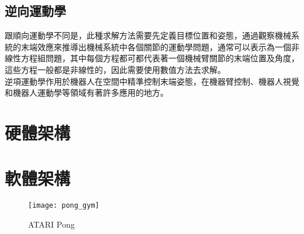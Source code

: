 \subsection{逆向運動學}
跟順向運動學不同是，此種求解方法需要先定義目標位置和姿態，通過觀察機械系統的末端效應來推導出機械系統中各個關節的運動學問題，通常可以表示為一個非線性方程組問題，其中每個方程都可都代表著一個機械臂關節的末端位置及角度，這些方程一般都是非線性的，因此需要使用數值方法去求解。\\
逆項運動學作用於機器人在空間中精準控制末端姿態，在機器臂控制、機器人視覺和機器人運動學等領域有著許多應用的地方。\\

\section{硬體架構}
 
 \section{軟體架構}
\begin{figure}[hbt!]
\begin{center}
\texttt{[image: pong\_gym]}
\caption{\Large ATARI Pong}\label{fig.pong}
\end{center}
\end{figure} 

\newpage
